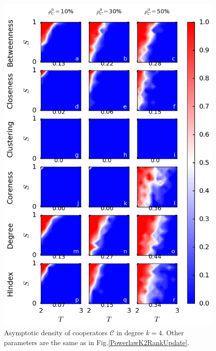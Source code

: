 \documentclass[preprint,12pt,3p]{elsarticle}
\begin{document}
\begin{figure}[htbp]
\centering
\includegraphics[width=13cm]{PowerlawK4RankUpdate.png}
\caption{Asymptotic density of cooperators $\mathcal{C}$ in degree $k=4$.
Other parameters are the same as in Fig.\ref{PowerlawK2RankUpdate}.}
\label{PowerlawK4RankUpdate}
\end{figure}
\end{document}
